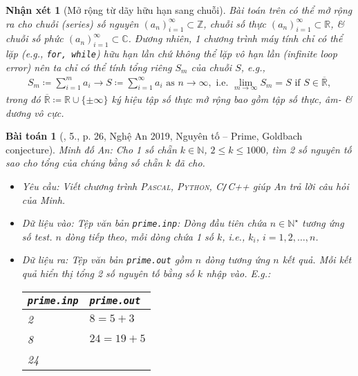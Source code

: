 \documentclass{article}
\newtheorem{baitoan}{Bài toán}
\newtheorem{nhanxet}{Nhận xét}
\begin{document}
\begin{nhanxet}[Mở rộng từ dãy hữu hạn sang chuỗi]
	Bài toán trên có thể mở rộng ra cho chuỗi (series) số nguyên $(a_n)_{i=1}^\infty\subset\mathbb{Z}$, chuỗi số thực $(a_n)_{i=1}^\infty\subset\mathbb{R}$, \& chuỗi số phức $(a_n)_{i=1}^\infty\subset\mathbb{C}$. Đương nhiên, 1 chương trình máy tính chỉ có thể lặp (e.g., \texttt{for, while}) hữu hạn lần chứ không thể lặp vô hạn lần (infinite loop error) nên ta chỉ có thể tính tổng riêng $S_m$ của chuỗi $S$, e.g.,
	\begin{align*}
		S_m\coloneqq\sum_{i=1}^m a_i\to S\coloneqq\sum_{i=1}^\infty a_i\mbox{ as } n\to\infty,\mbox{ i.e. } \lim_{m\to\infty} S_m = S\mbox{ if } S\in\overline{\mathbb{R}},
	\end{align*}
	trong đó $\overline{\mathbb{R}}\coloneqq\mathbb{R}\cup\{\pm\infty\}$ ký hiệu tập số thực mở rộng bao gồm tập số thực, âm- \& dương vô cực.
\end{nhanxet}

\begin{baitoan}[\cite{VietSTEM2021}, 5., p. 26, Nghệ An 2019, Nguyên tố -- Prime, Goldbach conjecture]
	Minh đố An: Cho 1 số chẵn $k\in\mathbb{N}$, $2\le k\le1000$, tìm 2 số nguyên tố sao cho tổng của chúng bằng số chẵn $k$ đã cho.
	\begin{itemize}
		\item {\sf Yêu cầu:} Viết chương trình \textsc{Pascal, Python, C\texttt{/}C++} giúp An trả lời câu hỏi của Minh.
		\item {\sf Dữ liệu vào:} Tệp văn bản \verb|prime.inp|: Dòng đầu tiên chứa $n\in\mathbb{N}^\star$ tương ứng số test. $n$ dòng tiếp theo, mỗi dòng chứa 1 số $k$, i.e., $k_i$, $i = 1,2,\ldots,n$.
		\item {\sf Dữ liệu ra:} Tệp văn bản \verb|prime.out| gồm $n$ dòng tương ứng $n$ kết quả. Mỗi kết quả hiển thị tổng 2 số nguyên tố bằng số $k$ nhập vào. E.g.:
		\begin{table}[H]
			\centering
			\begin{tabular}{|l|l|}
				\hline
				\texttt{prime.inp} & \texttt{prime.out} \\
				\hline
				2 & $8 = 5 + 3$ \\
				8 & $24 = 19 + 5$ \\
				24 & \\
				\hline
			\end{tabular}
		\end{table}
	\end{itemize}
\end{baitoan}
\end{document}
